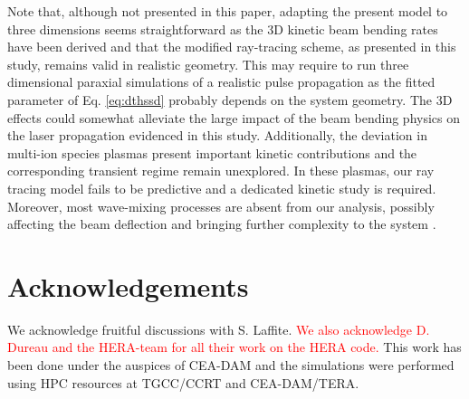 \documentclass[%
 reprint,
 amsmath,amssymb,
 aps,
]{revtex4-1}
\begin{document}
Note that, although not presented in this paper, adapting the present model to  three dimensions seems straightforward as the 3D kinetic  beam bending rates have been derived and that the modified ray-tracing scheme, as presented in this study, remains valid in realistic geometry. This may require to run three dimensional paraxial simulations  of a realistic pulse propagation as the fitted parameter  of Eq. \eqref{eq:dthssd}  probably depends on the system geometry.  
The 3D effects  could somewhat alleviate  the large impact of the beam bending physics on the laser propagation evidenced in this study.
Additionally, the deviation in multi-ion species plasmas present important kinetic contributions and the corresponding transient regime remain unexplored. 
In these plasmas,  our ray tracing model fails to be predictive and a dedicated kinetic study is required.
Moreover, most wave-mixing processes are absent from our analysis, possibly affecting the beam deflection and bringing further complexity to the system \cite[]{POP_Huller_2020}.

\section*{Acknowledgements}
We acknowledge fruitful discussions with S. Laffite.
 \textcolor{red}{We also acknowledge D. Dureau and the HERA-team for all their work on the HERA code. }
This work has been done under  the auspices of  CEA-DAM and
the simulations were performed using HPC resources at TGCC/CCRT and CEA-DAM/TERA.

\end{document}
